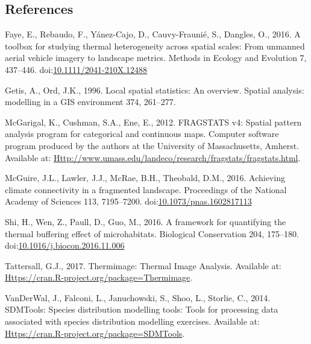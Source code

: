 \documentclass[12pt,british,a4paper,]{article}
\theoremstyle{definition}
\theoremstyle{definition}
\theoremstyle{definition}
\theoremstyle{remark}
\begin{document}
\subsection*{References}\label{references}

\hypertarget{refs}{}
\hypertarget{ref-faye_toolbox_2016}{}
Faye, E., Rebaudo, F., Yánez-Cajo, D., Cauvy-Fraunié, S., Dangles, O.,
2016. A toolbox for studying thermal heterogeneity across spatial
scales: From unmanned aerial vehicle imagery to landscape metrics.
Methods in Ecology and Evolution 7, 437--446.
doi:\href{https://doi.org/10.1111/2041-210X.12488}{10.1111/2041-210X.12488}

\hypertarget{ref-getis_local_1996}{}
Getis, A., Ord, J.K., 1996. Local spatial statistics: An overview.
Spatial analysis: modelling in a GIS environment 374, 261--277.

\hypertarget{ref-fragstats_2012}{}
McGarigal, K., Cushman, S.A., Ene, E., 2012. FRAGSTATS v4: Spatial
pattern analysis program for categorical and continuous maps. Computer
software program produced by the authors at the University of
Massachusetts, Amherst. Available at:
\href{http://www.umass.edu/landeco/research/fragstats/fragstats.html}{Http://www.umass.edu/landeco/research/fragstats/fragstats.html}.

\hypertarget{ref-mcguire_achieving_2016}{}
McGuire, J.L., Lawler, J.J., McRae, B.H., Theobald, D.M., 2016.
Achieving climate connectivity in a fragmented landscape. Proceedings of
the National Academy of Sciences 113, 7195--7200.
doi:\href{https://doi.org/10.1073/pnas.1602817113}{10.1073/pnas.1602817113}

\hypertarget{ref-shi_framework_2016}{}
Shi, H., Wen, Z., Paull, D., Guo, M., 2016. A framework for quantifying
the thermal buffering effect of microhabitats. Biological Conservation
204, 175--180.
doi:\href{https://doi.org/10.1016/j.biocon.2016.11.006}{10.1016/j.biocon.2016.11.006}

\hypertarget{ref-tattersall_thermimage:_2017}{}
Tattersall, G.J., 2017. Thermimage: Thermal Image Analysis. Available
at:
\href{https://CRAN.R-project.org/package=Thermimage}{Https://cran.R-project.org/package=Thermimage}.

\hypertarget{ref-sdmtools_2014}{}
VanDerWal, J., Falconi, L., Januchowski, S., Shoo, L., Storlie, C.,
2014. SDMTools: Species distribution modelling tools: Tools for
processing data associated with species distribution modelling
exercises. Available at:
\href{https://CRAN.R-project.org/package=SDMTools}{Https://cran.R-project.org/package=SDMTools}.
\end{document}
